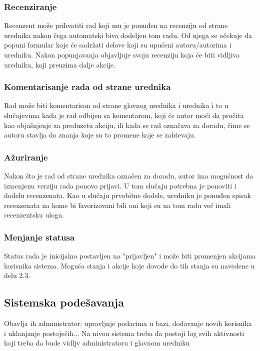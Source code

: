 \documentclass[a4paper]{article}
\begin{document}
\subsubsection{Recenziranje}
Recenzent može prihvatiti rad koji mu je ponuđen na recenziju od strane urednika nakon čega automatski biva dodeljen tom radu. Od njega se očekuje da popuni formular koje će sadržati delove koji su upućeni autoru/autorima i uredniku. Nakon popunjavanja objavljuje svoju recenziju koja će biti vidljiva uredniku, koji preuzima dalje akcije.
\subsubsection{Komentarisanje rada od strane urednika}
Rad može biti komentarisan od strane glavnog urednika i urednika i to u slučajevima kada je rad odbijen sa komentarom, koji će autor moći da pročita kao objašnjenje za preduzetu akciju, ili kada se rad označava za doradu, čime se autoru stavlja do znanja koje su to promene koje se zahtevaju.
\subsubsection{Ažuriranje}
Nakon što je rad od strane urednika označen za doradu, autor ima mogućnost da izmenjenu verziju rada ponovo prijavi. U tom slučaju potrebna je ponoviti i dodelu recenzenata. Kao u slučaju prvobitne dodele, uredniku je ponuđen spisak recenzenata na kome bi favorizovani bili oni koji su na tom radu već imali recenzentsku ulogu.
\subsubsection{Menjanje statusa}
Status rada je inicijalno postavljen na "prijavljen" i može biti promenjen akcijama korisnika sistema. Moguća stanja i akcije koje dovode do tih stanja su navedene u delu 2.3.


\subsection{Sistemska podešavanja}
Obavlja ih administrator: upravljnje podacima u bazi, dodavanje novih korisnika i uklanjanje postojećih... Na nivou sistema treba da postoji log svih aktivnosti koji treba da bude vidljv administratoru i glavnom uredniku
\end{document}
